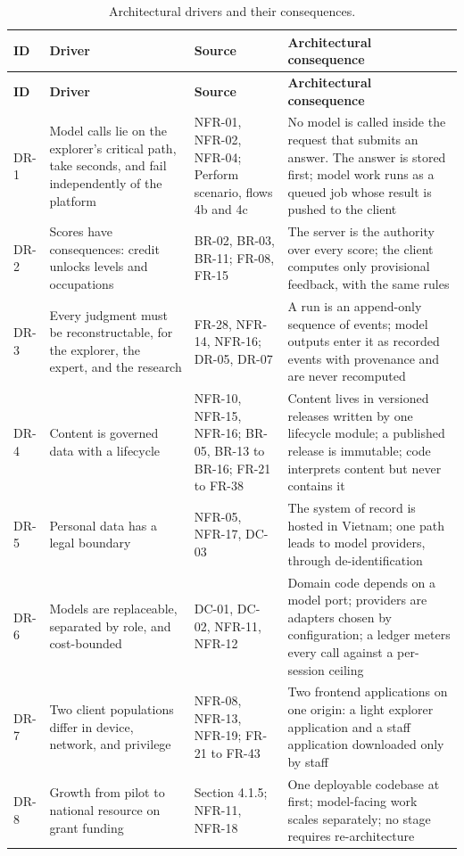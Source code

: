 {\small{}\renewcommand{\arraystretch}{1.1}
\begin{longtable}{|>{\raggedright\arraybackslash}p{}|>{\raggedright\arraybackslash}p{}|>{\raggedright\arraybackslash}p{}|>{\raggedright\arraybackslash}p{}|}
\caption{Architectural drivers and their consequences.} \\
\hline
\textbf{ID} & \textbf{Driver} & \textbf{Source} & \textbf{Architectural consequence} \\ \hline
\endfirsthead
\hline
\textbf{ID} & \textbf{Driver} & \textbf{Source} & \textbf{Architectural consequence} \\ \hline
\endhead
DR-1 & Model calls lie on the explorer's critical path, take seconds, and fail independently of the platform & NFR-01, NFR-02, NFR-04; Perform scenario, flows 4b and 4c & No model is called inside the request that submits an answer. The answer is stored first; model work runs as a queued job whose result is pushed to the client \\ \hline
DR-2 & Scores have consequences: credit unlocks levels and occupations & BR-02, BR-03, BR-11; FR-08, FR-15 & The server is the authority over every score; the client computes only provisional feedback, with the same rules \\ \hline
DR-3 & Every judgment must be reconstructable, for the explorer, the expert, and the research & FR-28, NFR-14, NFR-16; DR-05, DR-07 & A run is an append-only sequence of events; model outputs enter it as recorded events with provenance and are never recomputed \\ \hline
DR-4 & Content is governed data with a lifecycle & NFR-10, NFR-15, NFR-16; BR-05, BR-13 to BR-16; FR-21 to FR-38 & Content lives in versioned releases written by one lifecycle module; a published release is immutable; code interprets content but never contains it \\ \hline
DR-5 & Personal data has a legal boundary & NFR-05, NFR-17, DC-03 & The system of record is hosted in Vietnam; one path leads to model providers, through de-\allowbreak{}identification \\ \hline
DR-6 & Models are replaceable, separated by role, and cost-\allowbreak{}bounded & DC-01, DC-02, NFR-11, NFR-12 & Domain code depends on a model port; providers are adapters chosen by configuration; a ledger meters every call against a per-session ceiling \\ \hline
DR-7 & Two client populations differ in device, network, and privilege & NFR-08, NFR-13, NFR-19; FR-21 to FR-43 & Two frontend applications on one origin: a light explorer application and a staff application downloaded only by staff \\ \hline
DR-8 & Growth from pilot to national resource on grant funding & Section 4.1.5; NFR-11, NFR-18 & One deployable codebase at first; model-\allowbreak{}facing work scales separately; no stage requires re-\allowbreak{}architecture \\ \hline
\end{longtable}
}

